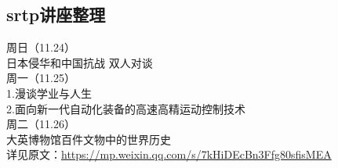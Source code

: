\documentclass[letterpaper, 12pt]{article}
\begin{document}
\begin{multicols}{2}
\section{srtp讲座整理}
周日（11.24）\\
日本侵华和中国抗战 双人对谈\\
周一（11.25）\\
1.漫谈学业与人生\\
2.面向新一代自动化装备的高速高精运动控制技术\\
周二（11.26）\\
大英博物馆百件文物中的世界历史\\
详见原文：\url{https://mp.weixin.qq.com/s/7kHiDEcBn3Ffg80sfisMEA}

\end{multicols} 
\end{document}
